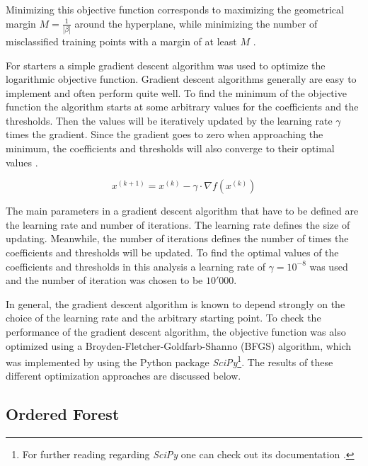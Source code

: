 \documentclass[11pt]{article}
\begin{document}
\vspace{12pt}

Minimizing this objective function corresponds to maximizing the geometrical margin $M = \frac{1}{|\beta|}$ around the hyperplane, while minimizing the number of misclassified training points with a margin of at least $M$ \cite{rennie2005}.

For starters a simple gradient descent algorithm was used to optimize the logarithmic objective function. Gradient descent algorithms generally are easy to implement and often perform quite well. To find the minimum of the objective function the algorithm starts at some arbitrary values for the coefficients and the thresholds. Then the values will be iteratively updated by the learning rate $\gamma$ times the gradient. Since the gradient goes to zero when approaching the minimum, the coefficients and thresholds will also converge to their optimal values \cite[p. 113f]{chong2013}.

$$
x^{(k + 1)} = x^{(k)} - \gamma \cdot \nabla f(x^{(k)})
$$

The main parameters in a gradient descent algorithm that have to be defined are the learning rate and number of iterations. The learning rate defines the size of updating. Meanwhile, the number of iterations defines the number of times the coefficients and thresholds will be updated. To find the optimal values of the coefficients and thresholds in this analysis a learning rate of $\gamma = 10^{-8}$ was used and the number of iteration was chosen to be $10'000$.

In general, the gradient descent algorithm is known to depend strongly on the choice of the learning rate and the arbitrary starting point. To check the performance of the gradient descent algorithm, the objective function was also optimized using a Broyden-Fletcher-Goldfarb-Shanno (BFGS) algorithm, which was implemented by using the Python package \textit{SciPy}\footnote{For further reading regarding \textit{SciPy} one can check out its documentation \cite{scipy2021}.}. The results of these different optimization approaches are discussed below.


\subsection{Ordered Forest}
\end{document}
